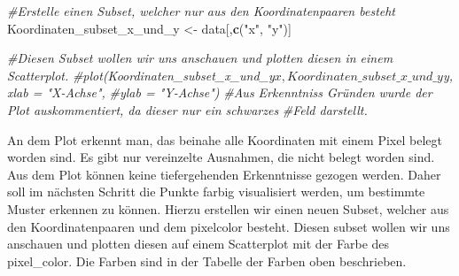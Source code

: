 \documentclass[
]{article}
\newenvironment{Shaded}{\begin{snugshade}}{\end{snugshade}}
\newcommand{\AttributeTok}[1]{\textcolor[rgb]{0.13,0.29,0.53}{#1}}
\newcommand{\CommentTok}[1]{\textcolor[rgb]{0.56,0.35,0.01}{\textit{#1}}}
\newcommand{\DecValTok}[1]{\textcolor[rgb]{0.00,0.00,0.81}{#1}}
\newcommand{\FunctionTok}[1]{\textcolor[rgb]{0.13,0.29,0.53}{\textbf{#1}}}
\newcommand{\NormalTok}[1]{#1}
\newcommand{\OtherTok}[1]{\textcolor[rgb]{0.56,0.35,0.01}{#1}}
\newcommand{\SpecialCharTok}[1]{\textcolor[rgb]{0.81,0.36,0.00}{\textbf{#1}}}
\newcommand{\StringTok}[1]{\textcolor[rgb]{0.31,0.60,0.02}{#1}}
\begin{document}
\begin{Shaded}
\begin{Highlighting}[]
\CommentTok{\#Erstelle einen Subset, welcher nur aus den Koordinatenpaaren besteht}
\NormalTok{Koordinaten\_subset\_x\_und\_y }\OtherTok{\textless{}{-}}\NormalTok{ data[,}\FunctionTok{c}\NormalTok{(}\StringTok{"x"}\NormalTok{, }\StringTok{"y"}\NormalTok{)]}

\CommentTok{\#Diesen Subset wollen wir uns anschauen und plotten diesen in einem Scatterplot.}
\CommentTok{\#plot(Koordinaten\_subset\_x\_und\_y$x, Koordinaten\_subset\_x\_und\_y$y, xlab = "X{-}Achse", }
      \CommentTok{\#ylab = "Y{-}Achse")}
\CommentTok{\#Aus Erkenntniss Gründen wurde der Plot auskommentiert, da dieser nur ein schwarzes }
  \CommentTok{\#Feld darstellt.}
\end{Highlighting}
\end{Shaded}

An dem Plot erkennt man, das beinahe alle Koordinaten mit einem Pixel
belegt worden sind. Es gibt nur vereinzelte Ausnahmen, die nicht belegt
worden sind. Aus dem Plot können keine tiefergehenden Erkenntnisse
gezogen werden. Daher soll im nächsten Schritt die Punkte farbig
visualisiert werden, um bestimmte Muster erkennen zu können. Hierzu
erstellen wir einen neuen Subset, welcher aus den Koordinatenpaaren und
dem pixelcolor besteht. Diesen subset wollen wir uns anschauen und
plotten diesen auf einem Scatterplot mit der Farbe des pixel\_color. Die
Farben sind in der Tabelle der Farben oben beschrieben.

\begin{Shaded}
\end{Shaded}
\end{document}
